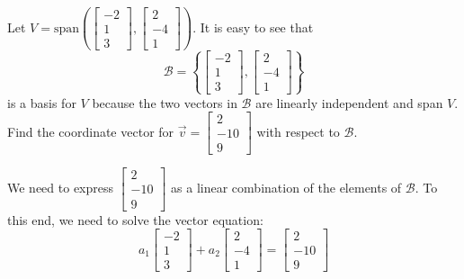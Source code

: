 \documentclass{ximera}
\begin{document}

\begin{example}
Let $V=\mbox{span}\left(\begin{bmatrix}-2\\1\\3\end{bmatrix},\begin{bmatrix}2\\-4\\1\end{bmatrix}\right)$.  It is easy to see that $$\mathcal{B}=\left\{\begin{bmatrix}-2\\1\\3\end{bmatrix},\begin{bmatrix}2\\-4\\1\end{bmatrix}\right\}$$ is a basis for $V$ because the two vectors in $\mathcal{B}$ are linearly independent and span $V$.  Find the coordinate vector for $\vec{v}=\begin{bmatrix}2\\-10\\9\end{bmatrix}$ with respect to $\mathcal{B}$.
\begin{explanation}
We need to express $\begin{bmatrix}2\\-10\\9\end{bmatrix}$ as a linear combination of the elements of $\mathcal{B}$.  To this end, we need to solve the vector equation:
 $$a_1\begin{bmatrix}-2\\1\\3\end{bmatrix}+a_2\begin{bmatrix}2\\-4\\1\end{bmatrix}=\begin{bmatrix}2\\-10\\9\end{bmatrix}$$

\end{explanation}
\end{example}
\end{document}
